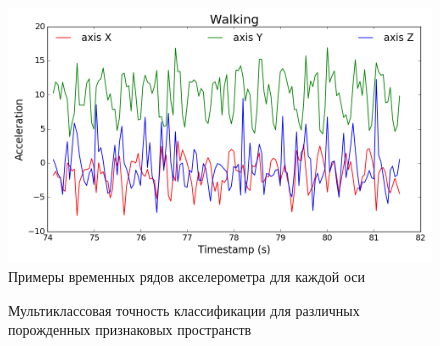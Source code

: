 \begin{figure}[!ht]
	\centering
	\includegraphics[width=1\linewidth]{figs/ch6/ts_example.png}
	\caption{Примеры временных рядов акселерометра для каждой оси}
	\label{ch6:fig:ts_example}
\end{figure}

\begin{figure}[!ht]
	\centering
	\caption{Мультиклассовая точность классификации для различных порожденных признаковых пространств}
	\label{ch6:fig:accuracy_results}
\end{figure}


